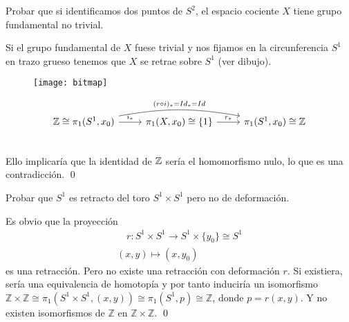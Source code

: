 \documentclass[GTS.tex]{subfiles}
\begin{document}
\begin{ejer}
Probar que si identificamos dos puntos de $S^2$, el espacio cociente $X$ tiene grupo fundamental no trivial.
\end{ejer}
\begin{solucion}Si el grupo fundamental de $X$ fuese trivial y nos fijamos en la circunferencia $S^1$ en trazo grueso tenemos que $X$ se retrae sobre $S^1$ (ver dibujo).
\begin{figure}[h!]
	\texttt{[image: bitmap]}
\end{figure}
\[
\begin{tikzcd}
\Z\cong\pi_1(S^1,x_0)\arrow[r,"i_* "] \arrow[rr,"(r\circ i)_*=Id_*=Id",bend left=10] &  \pi_1(X,x_0)\cong\{1\}\ar[r, "r_* "] & \pi_1(S^1,x_0)\cong\Z\\
\end{tikzcd}
\]
Ello implicaría que la identidad de $\mathbb{Z}$ sería el homomorfismo nulo, lo que es una contradicción. \qed
\end{solucion}

\begin{ejer}
Probar que $S^1$ es retracto del toro $S^1\times S^1$ pero no de deformación.
\end{ejer}
\begin{solucion}
Es obvio que la proyección
\begin{gather*}
\quad r:S^1\times S^1\longrightarrow S^1\times\{y_0\}\cong S^1\\
(x,y)\longmapsto (x,y_0)
\end{gather*}
es una retracción. Pero no existe una retracción con deformación $r$. Si existiera, sería una equivalencia de homotopía y por tanto induciría un isomorfismo 
$\mathbb{Z}\times \mathbb{Z} \cong \pi_1(S^1\times S^1,(x,y)) \cong
\pi_1(S^1, p)\cong \mathbb{Z}$, donde $p = r(x,y)$. Y no existen isomorfismos de $\mathbb{Z}$ en
$\mathbb {Z}\times \mathbb{Z}$.  
\qed
\end{solucion}
\end{document}
